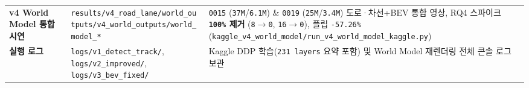 \documentclass[10.5pt,a4paper]{article}
\begin{document}
\begin{footnotesize}
\begin{longtable}{>{\raggedright\arraybackslash}p{} >{\raggedright\arraybackslash}p{} >{\raggedright\arraybackslash}p{}}
\textbf{v4 World Model 통합 시연} & \texttt{results/\allowbreak{}v4\_\allowbreak{}road\_\allowbreak{}lane/\allowbreak{}world\_\allowbreak{}outputs/\allowbreak{}v4\_\allowbreak{}world\_\allowbreak{}outputs/\allowbreak{}world\_\allowbreak{}model\_\allowbreak{}*} & \texttt{0015} (\texttt{37M}/\texttt{6.\allowbreak{}1M}) \& \texttt{0019} (\texttt{25M}/\texttt{3.\allowbreak{}4M}) 도로·차선+BEV 통합 영상, RQ4 스파이크 \textbf{\texttt{100\%} 제거} (\texttt{8$\rightarrow$0}, \texttt{16$\rightarrow$0}), 플립 \texttt{-\allowbreak{}57.\allowbreak{}26\%} (\texttt{kaggle\_\allowbreak{}v4\_\allowbreak{}world\_\allowbreak{}model/\allowbreak{}run\_\allowbreak{}v4\_\allowbreak{}world\_\allowbreak{}model\_\allowbreak{}kaggle.\allowbreak{}py}) \\
\textbf{실행 로그} & \texttt{logs/\allowbreak{}v1\_\allowbreak{}detect\_\allowbreak{}track/\allowbreak{}}, \texttt{logs/\allowbreak{}v2\_\allowbreak{}improved/\allowbreak{}}, \texttt{logs/\allowbreak{}v3\_\allowbreak{}bev\_\allowbreak{}fixed/\allowbreak{}} & Kaggle DDP 학습(\texttt{231 layers} 요약 포함) 및 World Model 재렌더링 전체 콘솔 로그 보관 \\
\end{longtable}
\end{footnotesize}

\newpage
\end{document}
